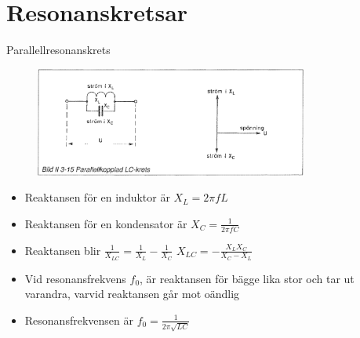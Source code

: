 \documentclass{beamer}
\begin{document}
\section{Resonanskretsar}

\begin{frame}{Parallellresonanskrets}

\begin{figure}[h]
\includegraphics[width=0.8\textwidth]{images/bild_2_3-15}
\end{figure}

\begin{itemize}
  \item Reaktansen för en induktor är $X_L = 2\pi f L$
  \item Reaktansen för en kondensator är $X_C = \frac{1}{2\pi f C}$
  \item Reaktansen blir $\frac{1}{X_{LC}} = \frac{1}{X_L} - \frac{1}{X_C}$ $X_{LC}=-\frac{X_LX_C}{X_C-X_L}$
  \item Vid resonansfrekvens $f_0$, är reaktansen för bägge lika stor och tar ut varandra, varvid reaktansen går mot oändlig
  \item Resonansfrekvensen är $f_0 = \frac{1}{2\pi\sqrt{LC}}$
  \end{itemize}
\end{frame}
\end{document}
